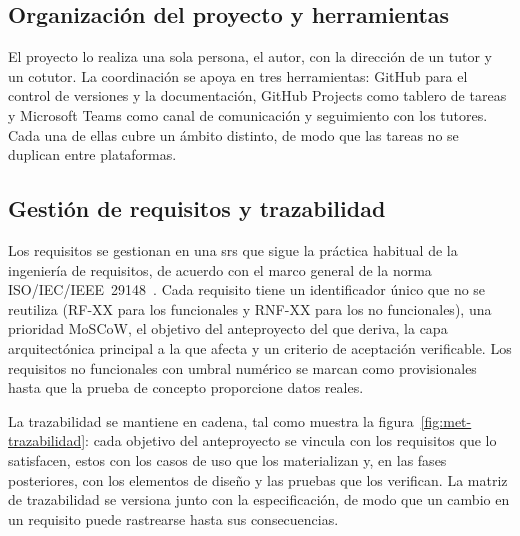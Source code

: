 \subsection{Organización del proyecto y herramientas}

El proyecto lo realiza una sola persona, el autor, con la dirección de un tutor y un cotutor. La coordinación se apoya en tres herramientas: GitHub para el control de versiones y la documentación, GitHub Projects como tablero de tareas y Microsoft Teams como canal de comunicación y seguimiento con los tutores. Cada una de ellas cubre un ámbito distinto, de modo que las tareas no se duplican entre plataformas.

\subsection{Gestión de requisitos y trazabilidad}

Los requisitos se gestionan en una \acf{srs} que sigue la práctica habitual de la ingeniería de requisitos, de acuerdo con el marco general de la norma ISO/IEC/IEEE~29148~\cite{iso29148}. Cada requisito tiene un identificador único que no se reutiliza (RF-XX para los funcionales y RNF-XX para los no funcionales), una prioridad MoSCoW, el objetivo del anteproyecto del que deriva, la capa arquitectónica principal a la que afecta y un criterio de aceptación verificable. Los requisitos no funcionales con umbral numérico se marcan como provisionales hasta que la prueba de concepto proporcione datos reales.

La trazabilidad se mantiene en cadena, tal como muestra la figura~\ref{fig:met-trazabilidad}: cada objetivo del anteproyecto se vincula con los requisitos que lo satisfacen, estos con los casos de uso que los materializan y, en las fases posteriores, con los elementos de diseño y las pruebas que los verifican. La matriz de trazabilidad se versiona junto con la especificación, de modo que un cambio en un requisito puede rastrearse hasta sus consecuencias.


